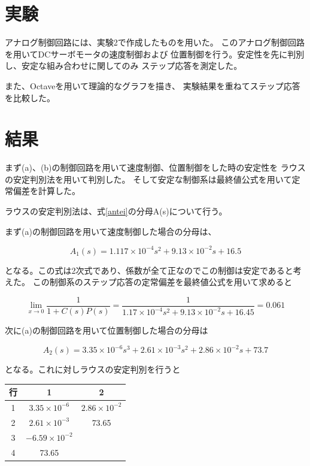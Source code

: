 \documentclass[uplatex, 11pt,a4j, titlepage]{jsarticle}
\begin{document}
\section{実験}

アナログ制御回路には、実験2で作成したものを用いた。
このアナログ制御回路を用いてDCサーボモータの速度制御および
位置制御を行う。安定性を先に判別し、安定な組み合わせに関してのみ
ステップ応答を測定した。

また、Octaveを用いて理論的なグラフを描き、
実験結果を重ねてステップ応答を比較した。

\section{結果}

まず(a)、(b)の制御回路を用いて速度制御、位置制御をした時の安定性を
ラウスの安定判別法を用いて判別した。
そして安定な制御系は最終値公式を用いて定常偏差を計算した。

ラウスの安定判別法は、式\ref{antei}の分母A(s)について行う。

まず(a)の制御回路を用いて速度制御した場合の分母は、

\begin{equation}
    A_1(s) = 1.117\times10^{-4}s^2 + 9.13\times10^{-2} s + 16.5
\end{equation}

となる。この式は2次式であり、係数が全て正なのでこの制御は安定であると考えた。
この制御系のステップ応答の定常偏差を最終値公式を用いて求めると

\begin{equation}
    \lim_{x \to 0} \frac{1}{1 + C(s)P(s)} = 
        \frac{1}{1.17\times10^{-4}s^2 + 9.13\times10^{-2}s + 16.45}
            = 0.061
\end{equation}

次に(a)の制御回路を用いて位置制御した場合の分母は

\begin{equation}
    A_2(s) = 3.35\times10^{-6}s^3 + 2.61\times10^{-3}s^2 
        + 2.86\times10^{-2}s + 73.7
\end{equation}

となる。これに対しラウスの安定判別を行うと

\begin{table}[h]
    \centering
    \begin{tabular}{|c||c|c|} \hline
        行 & 1 & 2 \\ \hline \hline
        1 & $3.35\times10^{-6}$ & $2.86\times10^{-2}$ \\ \hline
        2 & $2.61\times10^{-3}$ & 73.65 \\ \hline
        3 & $-6.59\times10^{-2}$ & \  \\ \hline
        4 & 73.65 & \  \\ \hline
    \end{tabular}
\end{table}
\end{document}
